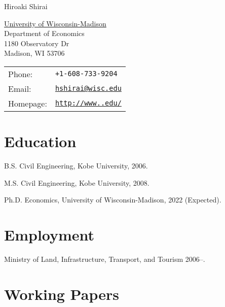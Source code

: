 \documentclass[letterpaper]{article}
\def\name{Hiroaki Shirai}
\renewenvironment{itemize}{
  \begin{list}{}{
    \setlength{\leftmargin}{1.5em}
  }
}{
  \end{list}
}
\begin{document}
{\huge \name}


\vspace{0.25in}

\begin{minipage}{0.45\linewidth}
  \href{http://www.unc.edu/}{University of Wisconsin-Madison} \\
  Department of Economics \\
  1180 Observatory Dr \\
  Madison, WI 53706
\end{minipage}
\begin{minipage}{0.45\linewidth}
  \begin{tabular}{ll}
    Phone: & {\tt +1-608-733-9204} \\
    Email: & \href{mailto:hshirai@wisc.edu}{\tt hshirai@wisc.edu} \\
    Homepage: & \href{http://www..edu/}{\tt http://www..edu/} \\
  \end{tabular}
\end{minipage}

\section*{Education}

\begin{itemize}
  \item B.S. Civil Engineering, Kobe University, 2006.
  \item M.S. Civil Engineering, Kobe University, 2008.
  \item Ph.D. Economics, University of Wisconsin-Madison, 2022 (Expected).
\end{itemize}


\section*{Employment}

\begin{itemize}
\item Ministry of Land, Infrastructure, Transport, and Tourism 2006--.
\end{itemize}


\section*{Working Papers}
\end{document}
